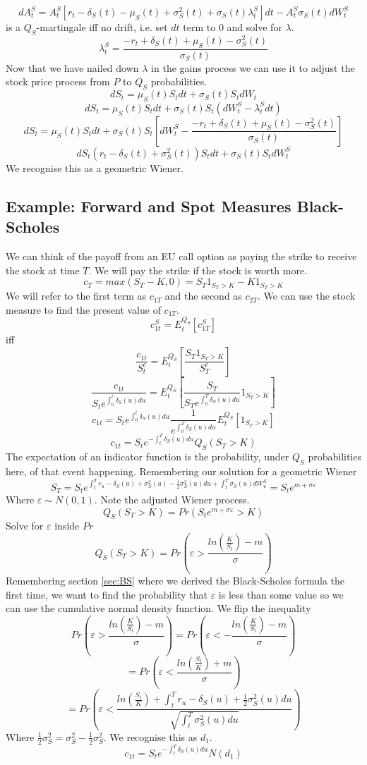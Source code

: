 \documentclass[12pt]{article}
\begin{document}
$$dA_t^S=A_t^S\left[ r_t-\delta_S(t)-\mu_S(t)+\sigma_S^2(t)+
\sigma_S(t)\lambda_t^S\right] dt-
A_t^S\sigma_S(t)dW_t^S$$
is a $Q_S$-martingale iff no drift, i.e. set $dt$ term to $0$ and solve for
$\lambda$.
$$\lambda_t^S=\frac{-r_t+\delta_S(t)+\mu_S(t)-\sigma_S^2(t)}{\sigma_S(t)}$$
Now that we have nailed down $\lambda$ in the gains process we can use it to
adjust the stock price process from $P$ to $Q_S$ probabilities.
$$dS_t=\mu_S(t)S_tdt+\sigma_S(t)S_tdW_t$$
$$dS_t=\mu_S(t)S_tdt+\sigma_S(t)S_t(dW_t^S-\lambda_t^Sdt)$$
$$dS_t=\mu_S(t)S_tdt+\sigma_S(t)S_t\left[ dW_t^S-
\frac{-r_t+\delta_S(t)+\mu_S(t)-\sigma_S^2(t)}{\sigma_S(t)}\right]$$
$$dS_t(r_t-\delta_S(t)+\sigma_S^2(t))S_tdt+\sigma_S(t)S_tdW_t^S$$
We recognise this as a geometric Wiener.

\subsection{Example: Forward and Spot Measures Black-Scholes}

We can think of the payoff from an EU call option as paying the strike to
receive the stock at time $T$. We will pay the strike if the stock is worth
more.
$$c_T=max(S_T-K,0)=S_T1_{S_T>K}-K1_{S_T>K}$$
We will refer to the first term as $c_{1T}$ and the second as $c_{2T}$.
We can use the stock measure to find the present value of $c_{1T}$.
$$c_{1t}^S=E_t^{Q_S}[c_{1T}^S]$$
iff
$$\frac{c_{1t}}{S_t^c}=E_t^{Q_S}\left[\frac{S_T1_{S_T>K}}{S_T^c}\right]$$
$$\frac{c_{1t}}{S_te^{\int_0^t\delta_S(u)du}}=
E_t^{Q_S}\left[\frac{S_T}{S_Te^{\int_0^T\delta_S(u)du}}1_{S_T>K}\right]$$
$$c_{1t}=S_te^{\int_0^t\delta_S(u)du}\frac{1}{e^{\int_0^T\delta_S(u)du}}
E_t^{Q_S}\left[ 1_{S_T>K}\right]$$
$$c_{1t}=S_te^{-\int_t^T\delta_S(u)du}Q_S(S_T>K)$$
The expectation of an indicator function is the probability, under $Q_S$
probabilities here, of that event happening.
Remembering our solution for a geometric Wiener
$$S_T=S_te^{\int_t^Tr_u-\delta_S(u)+\sigma_S^2(u)-\frac{1}{2}\sigma_S^2(u)du+
\int_t^T\sigma_S(u)dW_u^S}=S_te^{m+\sigma\varepsilon}$$
Where $\varepsilon\sim N(0,1)$.
Note the adjusted Wiener process.
$$Q_S(S_T>K)=Pr(S_te^{m+\sigma\varepsilon}>K)$$
Solve for $\varepsilon$ inside $Pr$
$$Q_S(S_T>K)=
Pr\left(\varepsilon>\frac{ln\left(\frac{K}{S_t}\right) -m}{\sigma}\right)$$
Remembering section \ref{sec:BS} where we derived the Black-Scholes formula the
first time, we want to find the probability that $\varepsilon$ is less than
some value so we can use the cumulative normal density function. We flip the
inequality
$$Pr\left(\varepsilon>\frac{ln\left(\frac{K}{S_t}\right) -m}{\sigma}\right)=
Pr\left(\varepsilon<-\frac{ln\left(\frac{K}{S_t}\right) -m}{\sigma}\right)$$
$$=Pr\left(\varepsilon<\frac{ln\left(\frac{S_t}{K}\right) +m}{\sigma}\right)$$
$$=Pr\left(\varepsilon<\frac{ln\left(\frac{S_t}{K}\right) +
  \int_t^Tr_u-\delta_S(u)+\frac{1}{2}\sigma_S^2(u)du}
{\sqrt{\int_t^T\sigma_S^2(u)du}}\right)$$
Where $\frac{1}{2}\sigma_S^2=\sigma_S^2-\frac{1}{2}\sigma_S^2$. We
recognise this as $d_1$.
\begin{equation} \label{c1t}
  c_{1t}=S_te^{-\int_t^T\delta_S(u)du}N(d_1)
\end{equation}
\end{document}
